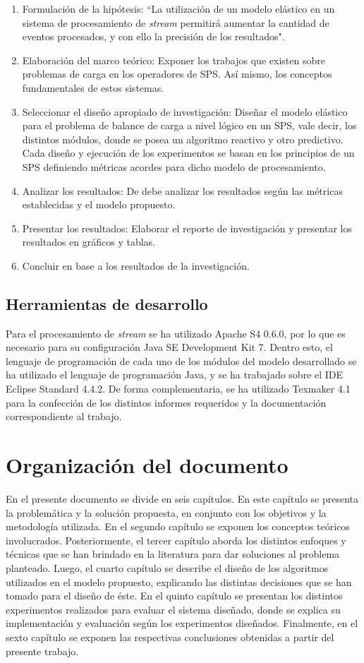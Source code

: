 \begin{enumerate}
	\item Formulación de la hipótesis: ``La utilización de un modelo elástico en un sistema de procesamiento de \textit{stream} permitirá aumentar la cantidad de eventos procesados, y con ello la precisión de los resultados".
	\item Elaboración del marco teórico: Exponer los trabajos que existen sobre problemas de carga en los operadores de SPS. Así mismo, los conceptos fundamentales de estos sistemas.
	\item Seleccionar el diseño apropiado de investigación: Diseñar el modelo elástico para el problema de balance de carga a nivel lógico en un SPS, vale decir, los distintos módulos, donde se posea un algoritmo reactivo y otro predictivo. Cada diseño y ejecución de los experimentos se basan en los principios de un SPS definiendo métricas acordes para dicho modelo de procesamiento.
	\item Analizar los resultados: De debe analizar los resultados según las métricas establecidas y el modelo propuesto.
	\item Presentar los resultados: Elaborar el reporte de investigación y presentar los resultados en gráficos y tablas.
	\item Concluir en base a los resultados de la investigación.
\end{enumerate}

\subsection{Herramientas de desarrollo}
Para el procesamiento de \textit{stream} se ha utilizado Apache S4 0.6.0, por lo que es necesario para su configuración Java SE Development Kit 7. Dentro esto, el lenguaje de programación de cada uno de los módulos del modelo desarrollado se ha utilizado el lenguaje de programación Java, y se ha trabajado sobre el IDE Eclipse Standard 4.4.2. De forma complementaria, se ha utilizado Texmaker 4.1 para la confección de los distintos informes requeridos y la documentación correspondiente al trabajo.

\section{Organización del documento}
\label{intro:organizacion}
En el presente documento se divide en seis capítulos. En \normalsize{este} capítulo se presenta la problemática y la solución propuesta, en conjunto con los objetivos y la metodología utilizada. En el segundo capítulo se exponen los conceptos teóricos involucrados. Posteriormente, el tercer capítulo aborda los distintos enfoques y técnicas que se han brindado en la literatura para dar soluciones al problema planteado. Luego, el cuarto capítulo se describe el diseño de los algoritmos utilizados en el modelo propuesto, explicando las distintas decisiones que se han tomado para el diseño de éste. En el quinto capítulo se presentan los distintos experimentos realizados para evaluar el sistema diseñado, donde se explica su implementación y evaluación según los experimentos diseñados. Finalmente, en el sexto capítulo se exponen las respectivas conclusiones obtenidas a partir del presente trabajo.